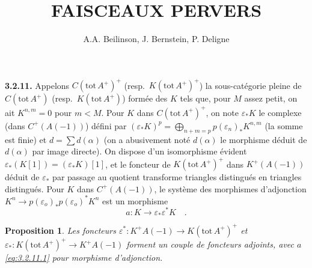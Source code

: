 \documentclass[12pt,a4paper]{article}
\title{\textbf{FAISCEAUX PERVERS}}
\author{A.A. Beilinson, J. Bernstein, P. Deligne}
\date{}
\theoremstyle{plain}
\newtheorem{proposition}[theorem]{Proposition}
\theoremstyle{definition}
\begin{document}
\maketitle
\thispagestyle{empty}



\noindent\textbf{3.2.11.} Appelons $C(\mathrm{tot}\, A^{+})^{+}$ (resp.\ $K(\mathrm{tot}\, A^{+})^{+}$) la sous-cat\'{e}gorie pleine de $C(\mathrm{tot}\, A^{+})$ (resp.\ $K(\mathrm{tot}\, A^{+})$) form\'{e}e des $K$ tels que, pour $M$ assez petit, on ait $K^{n,m} = 0$ pour $m < M$. Pour $K$ dans $C(\mathrm{tot}\, A^{+})^{+}$, on note $\varepsilon_{*}K$ le complexe (dans $C^{+}(A(-1))$) d\'{e}fini par $(\varepsilon_{*}K)^{p} = \bigoplus_{n+m=p} p(\varepsilon_{n})_{*}K^{n,m}$ (la somme est finie) et $d = \sum d(\alpha)$ (on a abusivement not\'{e} $d(\alpha)$ le morphisme d\'{e}duit de $d(\alpha)$ par image directe). On dispose d'un isomorphisme \'{e}vident $\varepsilon_{*}(K[1]) = (\varepsilon_{*}K)[1]$, et le foncteur de $K(\mathrm{tot}\, A^{+})^{+}$ dans $K^{+}(A(-1))$ d\'{e}duit de $\varepsilon_{*}$ par passage au quotient transforme triangles distingu\'{e}s en triangles distingu\'{e}s. Pour $K$ dans $C^{+}(A(-1))$, le syst\`{e}me des morphismes d'adjonction $K^{n} \to p(\varepsilon_{o})_{*}p(\varepsilon_{o})^{*}K^{n}$ est un morphisme
\begin{equation}\label{eq:3.2.11.1}
a : K \longrightarrow \varepsilon_{*}\varepsilon^{*}K\quad.
\end{equation}

\begin{proposition}\label{prop:3.2.12}
Les foncteurs $\varepsilon^{*}: K^{+}A(-1) \longrightarrow K(\mathrm{tot}\, A^{+})^{+}$ et $\varepsilon_{*}: K(\mathrm{tot}\, A^{+})^{+} \longrightarrow K^{+}A(-1)$ forment un couple de foncteurs adjoints, avec $a$ \eqref{eq:3.2.11.1} pour morphisme d'adjonction.
\end{proposition}
\end{document}
